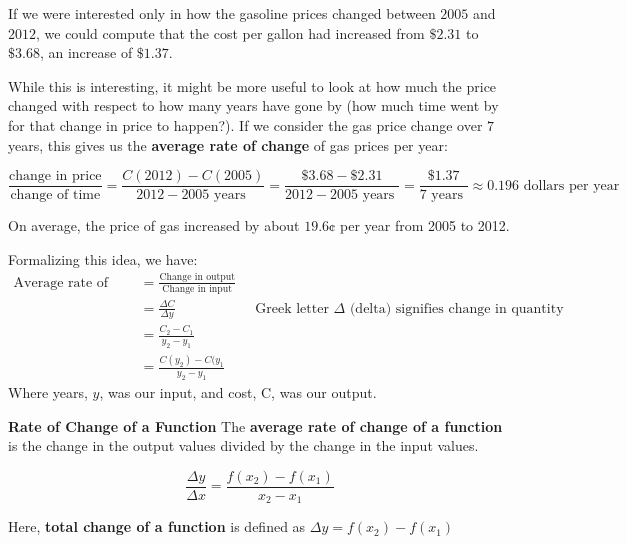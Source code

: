 \documentclass[12pt]{book}
\newcommand{\D}{\displaystyle}
\begin{document}
\vspace{5mm}


If we were interested only in how the gasoline prices changed between $2005$ and $2012$, we could compute that the cost per gallon had increased from $\$2.31$ to $\$3.68$, an increase of $\$1.37$. 

\vspace{5mm}

While this is interesting, it might be more useful to look at how much the price changed with respect to how many years have gone by (how much time went by for that change in price to happen?). If we consider the gas price change over $7$ years, this gives us the \textbf{average rate of change} of gas prices per year:

$$ \frac{\text{change in price}}{\text{change of time}} = \frac{C(2012) - C(2005)}{2012 - 2005 \text{ years }}  = \frac{\$3.68 - \$2.31}{2012 - 2005 \text{ years }} =  \frac{\$1.37}{7 \text{ years }} \approx 0.196 \text{ dollars per year}$$

\vspace{3mm}
On average, the price of gas increased by about $19.6$¢ per year from 2005 to 2012.
\vspace{5mm}

Formalizing this idea, we have: 
\begin{align*}
    \text{Average rate of change} &= \frac{\text{Change in output}}{\text{Change in input}} \\
    & = \frac{\Delta C}{\Delta y} &&\text{Greek letter $\Delta$ (delta) signifies change in quantity} \\
    & = \frac{C_2 -C_1}{y_2-y_1} \\
    & = \frac{C(y_2)-C(y_1}{y_2-y_1}
\end{align*}
 Where years, $y$, was our input, and cost, C, was our output. 

\newpage

\begin{boxR}
    \textbf{Rate of Change of a Function}
    \vspace{1mm}
    \hline
    \vspace{2mm}
The \textbf{average rate of change of a function} is the change in the output values divided by the change in the input values.

$$ \frac{\Delta y}{\Delta x} = \frac{f(x_2) - f(x_1)}{x_2-x_1}$$

Here, \textbf{total change of a function} is defined as $ \D \Delta y = f(x_2) - f(x_1)$
\end{boxR}
\end{document}
